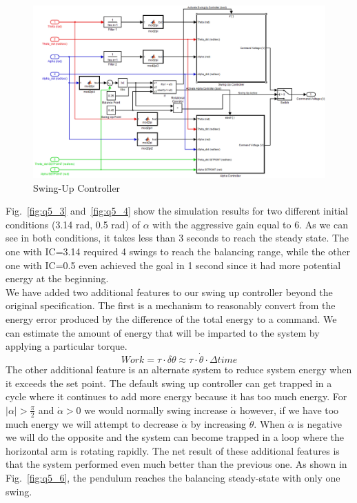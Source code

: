 \documentclass{article}
\theoremstyle{plain}
\theoremstyle{definition}
\theoremstyle{remark}
\begin{document}
\begin{figure}[h!]
\includegraphics[width=1\textwidth]{q5_2.png}
\caption{Swing-Up Controller} \label{tex}
\label{fig:q5_2}
\end{figure}

Fig.~\ref{fig:q5_3} and~\ref{fig:q5_4} show the simulation results for two different initial conditions (3.14 rad, 0.5 rad) of $\alpha$ with the aggressive gain equal to 6. As we can see in both conditions, it takes less than 3 seconds to reach the steady state. The one with IC=3.14 required 4 swings to reach the balancing range, while the other one with IC=0.5 even achieved the goal in 1 second since it had more potential energy at the beginning.\\

We have added two additional features to our swing up controller beyond the original specification.  The first is a mechanism to reasonably convert from the energy error produced by the difference of the total energy to a command.  We can estimate the amount of energy that will be imparted to the system by applying a particular torque.  
$$ Work = \tau \cdot \delta \theta \approx \tau \cdot \dot{\theta} \cdot \Delta time $$
The other additional feature is an alternate system to reduce system energy when it exceeds the set point.  The default swing up controller can get trapped in a cycle where it continues to add more energy because it has too much energy.  For $|\alpha| > \frac{\pi}{2}$ and $\dot{\alpha} > 0$ we would normally swing increase $\dot{\alpha}$ however, if we have too much energy we will attempt to decrease $\dot{\alpha}$ by increasing $\dot{\theta}$.  When $\dot{\alpha}$ is negative we will do the opposite and the system can become trapped in a loop where the horizontal arm is rotating rapidly.  
The net result of these additional features is that the system performed even much better than the previous one. As shown in Fig.~\ref{fig:q5_6}, the pendulum reaches the balancing steady-state with only one swing.       
\end{document}
